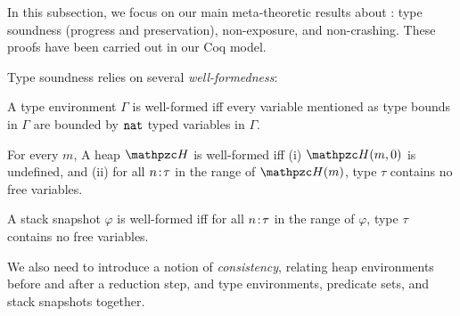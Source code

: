 %  
%  
%  
%  


In this subsection, we focus on our main meta-theoretic results about
\lang: type soundness (progress and preservation),
non-exposure, and non-crashing.
These proofs have been carried out in our Coq model.

Type soundness relies on several \emph{well-formedness}:

\begin{defi}\label{type-wellformed}
A type environment $\Gamma$ is well-formed iff every variable mentioned as type bounds in $\Gamma$ are bounded by $\texttt{nat}$ typed variables in $\Gamma$.
\end{defi}

\begin{defi}
For every $m$, A heap $\heap$ is well-formed iff (i) $\heap(m,0)$ is undefined, and
(ii) for all ${n}\!:\!{\tau}$ in the range of $\heap(m)$, type $\tau$
contains no free variables. 
\end{defi}

\begin{defi}
A stack snapshot $\varphi$ is well-formed iff
for all ${n}\!:\!{\tau}$ in the range of $\varphi$, type $\tau$
contains no free variables. 
\end{defi}

We also need to introduce a notion of
\emph{consistency}, relating heap environments before and after a
reduction step, and type environments, predicate sets, and stack
snapshots together.


